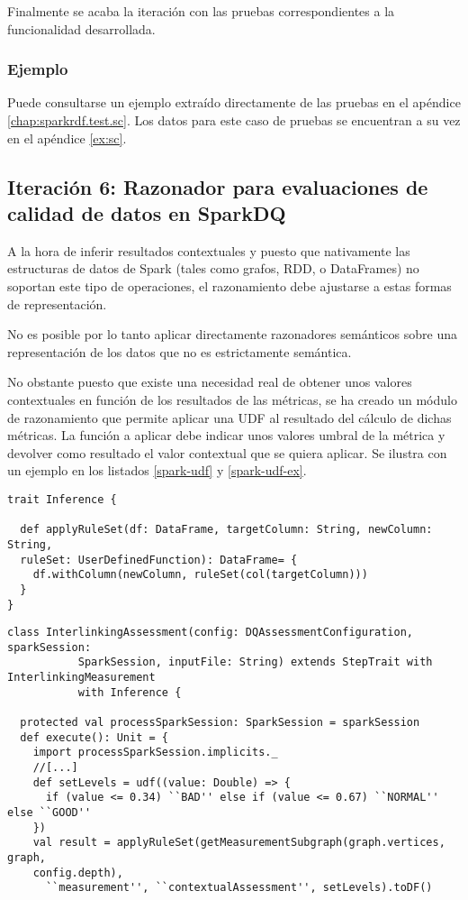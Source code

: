 Finalmente se acaba la iteración con las pruebas correspondientes a la
funcionalidad desarrollada. 

\subsubsection{Ejemplo}

Puede consultarse un ejemplo extraído directamente de las pruebas en el
apéndice \ref{chap:sparkrdf.test.sc}. Los datos para este caso de pruebas se encuentran a su vez en
el apéndice \ref{ex:sc}.


\subsection{Iteración 6: Razonador para evaluaciones de calidad de datos en SparkDQ}
\label{iter6-reasoner}
A la hora de inferir resultados contextuales y puesto que nativamente las
estructuras de datos de Spark (tales como grafos, \acs{RDD}, o DataFrames) no
soportan este tipo de operaciones, el razonamiento debe ajustarse a estas formas
de representación. 

No es posible por lo tanto aplicar directamente razonadores semánticos sobre una
representación de los datos que no es estrictamente semántica.

No obstante puesto que existe una necesidad real de obtener unos valores
contextuales en función de los resultados de las métricas, 
se ha creado un módulo de razonamiento que permite aplicar una
\acf{UDF} al resultado del cálculo de dichas métricas. La función a aplicar debe
indicar unos valores umbral de la métrica y devolver como resultado el valor
contextual que se quiera aplicar. Se ilustra con un ejemplo en los
listados \ref{spark-udf} y \ref{spark-udf-ex}. 

\lstset{escapechar=@,language=scala}
\begin{lstlisting}[caption={Aplicación de \acs{UDF} sobre DataFrame de SparkDQ},captionpos=b, label=spark-udf]
trait Inference {

  def applyRuleSet(df: DataFrame, targetColumn: String, newColumn: String,
  ruleSet: UserDefinedFunction): DataFrame= {
    df.withColumn(newColumn, ruleSet(col(targetColumn)))
  }
}
\end{lstlisting}

\newpage
\lstset{escapechar=@,language=scala}
\begin{lstlisting}[caption={Función de inferencia},captionpos=b,
    label=spark-udf-ex]
class InterlinkingAssessment(config: DQAssessmentConfiguration, sparkSession:
           SparkSession, inputFile: String) extends StepTrait with InterlinkingMeasurement
           with Inference {

  protected val processSparkSession: SparkSession = sparkSession
  def execute(): Unit = {
    import processSparkSession.implicits._
    //[...]
    def setLevels = udf((value: Double) => {
      if (value <= 0.34) ``BAD'' else if (value <= 0.67) ``NORMAL'' else ``GOOD''
    })
    val result = applyRuleSet(getMeasurementSubgraph(graph.vertices, graph,
    config.depth),
      ``measurement'', ``contextualAssessment'', setLevels).toDF()
\end{lstlisting}

